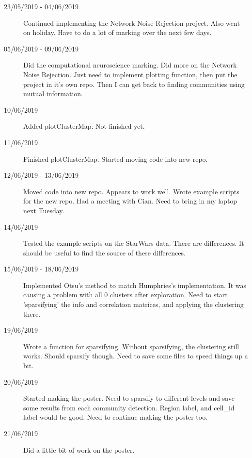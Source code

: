 \documentclass[a4paper,12pt]{article}
\theoremstyle{definition}
\begin{document}
\begin{description}
                                \item[23/05/2019 - 04/06/2019] Continued implementing the Network Noise Rejection project. Also went on holiday. Have to do a lot of marking over the next few days.

                                \item[05/06/2019 - 09/06/2019] Did the computational neuroscience marking. Did more on the Network Noise Rejection. Just need to implement plotting function, then put the project in it's own repo. Then I can get back to finding communities using mutual information.

                                \item[10/06/2019] Added plotClusterMap. Not finished yet.

                                \item[11/06/2019] Finished plotClusterMap. Started moving code into new repo.

                                \item[12/06/2019 - 13/06/2019] Moved code into new repo. Appears to work well. Wrote example scripts for the new repo. Had a meeting with Cian. Need to bring in my laptop next Tuesday.

                                \item[14/06/2019] Tested the example scripts on the StarWars data. There are differences. It should be useful to find the source of these differences.

                                \item[15/06/2019 - 18/06/2019] Implemented Otsu's method to match Humphries's implementation. It was causing a problem with all 0 clusters after exploration. Need to start 'sparsifying' the info and correlation matrices, and applying the clustering there.

                                \item[19/06/2019] Wrote a function for sparsifying. Without sparsifying, the clustering still works. Should sparsify though. Need to save some files to speed things up a bit.

                                \item[20/06/2019] Started making the poster. Need to sparsify to different levels and save some results from each community detection. Region label, and cell\_id label would be good. Need to continue making the poster too.
                                \item[21/06/2019] Did a little bit of work on the poster.


\end{description}
\end{document}
